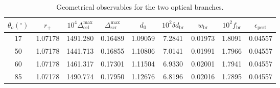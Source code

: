 \begin{table}[t]
\centering
\caption{Geometrical observables for the two optical branches.}
\begin{tabular}{ccccccccc}
\hline
$\theta_o({}^{\circ})$ & $r_+$ & $10^4\Delta_{\mathrm{cel}}^{\max}$ & $\Delta_{\mathrm{scr}}^{\max}$ & $d_0$ & $10^2\delta d_{\mathrm{br}}$ & $w_{\mathrm{br}}$ & $10^2 f_{\mathrm{br}}$ & $\epsilon_{\mathrm{pert}}$ \\
\hline
17 & 1.07178 & 1491.280 & 0.16489 & 1.09059 & 7.2841 & 0.01973 & 1.8091 & 0.04557 \\
50 & 1.07178 & 1441.713 & 0.16855 & 1.10806 & 7.0141 & 0.01991 & 1.7966 & 0.04557 \\
60 & 1.07178 & 1461.317 & 0.17301 & 1.11504 & 6.9330 & 0.02001 & 1.7941 & 0.04557 \\
85 & 1.07178 & 1490.774 & 0.17950 & 1.12676 & 6.8196 & 0.02016 & 1.7895 & 0.04557 \\
\hline
\end{tabular}
\end{table}
